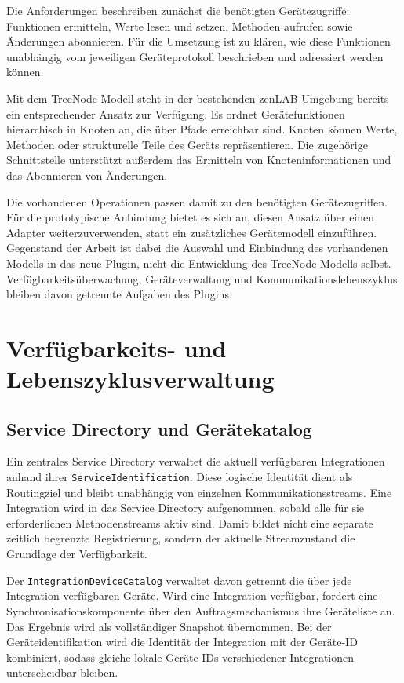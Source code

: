 Die Anforderungen beschreiben zunächst die benötigten Gerätezugriffe: Funktionen ermitteln, Werte lesen und setzen, Methoden aufrufen sowie Änderungen abonnieren. Für die Umsetzung ist zu klären, wie diese Funktionen unabhängig vom jeweiligen Geräteprotokoll beschrieben und adressiert werden können.

Mit dem TreeNode-Modell steht in der bestehenden zenLAB-Umgebung bereits ein entsprechender Ansatz zur Verfügung. Es ordnet Gerätefunktionen hierarchisch in Knoten an, die über Pfade erreichbar sind. Knoten können Werte, Methoden oder strukturelle Teile des Geräts repräsentieren. Die zugehörige Schnittstelle unterstützt außerdem das Ermitteln von Knoteninformationen und das Abonnieren von Änderungen.

Die vorhandenen Operationen passen damit zu den benötigten Gerätezugriffen. Für die prototypische Anbindung bietet es sich an, diesen Ansatz über einen Adapter weiterzuverwenden, statt ein zusätzliches Gerätemodell einzuführen. Gegenstand der Arbeit ist dabei die Auswahl und Einbindung des vorhandenen Modells in das neue Plugin, nicht die Entwicklung des TreeNode-Modells selbst. Verfügbarkeitsüberwachung, Geräteverwaltung und Kommunikationslebenszyklus bleiben davon getrennte Aufgaben des Plugins.

\section{Verfügbarkeits- und Lebenszyklusverwaltung}

\subsection{Service Directory und Gerätekatalog}

Ein zentrales Service Directory verwaltet die aktuell verfügbaren Integrationen anhand ihrer \texttt{ServiceIdentification}. Diese logische Identität dient als Routingziel und bleibt unabhängig von einzelnen Kommunikationsstreams. Eine Integration wird in das Service Directory aufgenommen, sobald alle für sie erforderlichen Methodenstreams aktiv sind. Damit bildet nicht eine separate zeitlich begrenzte Registrierung, sondern der aktuelle Streamzustand die Grundlage der Verfügbarkeit.

Der \texttt{IntegrationDeviceCatalog} verwaltet davon getrennt die über jede Integration verfügbaren Geräte. Wird eine Integration verfügbar, fordert eine Synchronisationskomponente über den Auftragsmechanismus ihre Geräteliste an. Das Ergebnis wird als vollständiger Snapshot übernommen. Bei der Geräteidentifikation wird die Identität der Integration mit der Geräte-ID kombiniert, sodass gleiche lokale Geräte-IDs verschiedener Integrationen unterscheidbar bleiben.


